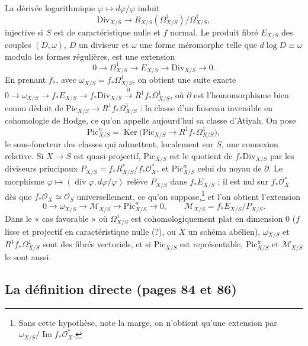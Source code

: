 \documentclass[11pt,a4paper]{article}
\begin{document}
La dérivée logarithmique $\varphi \mapsto d\varphi/\varphi$ induit
\[
\mathrm{Div}_{X/S} \longrightarrow R_{X/S}(\Omega^1_{X/S})/\Omega^1_{X/S} ,
\]
injective si $S$ est de caractéristique nulle et $f$ normal. Le produit fibré
$E_{X/S}$ des couples $(D, \omega)$, $D$ un diviseur et $\omega$ une forme
méromorphe telle que $d\log D \equiv \omega$ modulo les formes régulières, est
une extension
\[
0 \to \Omega^1_{X/S} \to E_{X/S} \to \mathrm{Div}_{X/S} \to 0 .
\]
En prenant $f_*$, avec $\omega_{X/S} = f_*\Omega^1_{X/S}$, on obtient une suite
exacte
$0 \to \omega_{X/S} \to f_*E_{X/S} \to f_*\mathrm{Div}_{X/S} \xrightarrow{\partial} R^1 f_*\Omega^1_{X/S}$,
où $\partial$ est l'homomorphisme bien connu déduit de
$\mathrm{Pic}_{X/S} \to R^1 f_*\Omega^1_{X/S}$ : la classe d'un faisceau
inversible en cohomologie de Hodge, ce qu'on appelle aujourd'hui sa classe
d'Atiyah. On pose
\[
\mathrm{Pic}^w_{X/S} = \operatorname{Ker}\bigl(\mathrm{Pic}_{X/S} \to R^1 f_*\Omega^1_{X/S}\bigr) ,
\]
le sous-foncteur des classes qui admettent, localement sur $S$, une connexion
relative. Si $X \to S$ est quasi-projectif, $\mathrm{Pic}_{X/S}$ est le
quotient de $f_*\mathrm{Div}_{X/S}$ par les diviseurs principaux
$P_{X/S} = f_*R^*_{X/S}/f_*\mathcal{O}^*_X$, et $\mathrm{Pic}^w_{X/S}$ celui
du noyau de $\partial$. Le morphisme $\varphi \mapsto (\operatorname{div}\varphi, d\varphi/\varphi)$
relève $P_{X/S}$ dans $f_*E_{X/S}$ ; il est nul sur $f_*\mathcal{O}^*_X$ dès que
$f_*\mathcal{O}_X \simeq \mathcal{O}_S$ universellement, ce qu'on suppose,\footnote{Sans cette hypothèse, note la marge, on n'obtient
qu'une extension par $\omega_{X/S}/\operatorname{Im} f_*\mathcal{O}^*_X$.} et
l'on obtient l'extension
\[
0 \to \omega_{X/S} \to \mathcal{M}_{X/S} \to \mathrm{Pic}^w_{X/S} \to 0, \qquad
\mathcal{M}_{X/S} = f_*E_{X/S}/P_{X/S} .
\]
Dans le « cas
favorable » où $\Omega^1_{X/S}$ est cohomologiquement plat en dimension $0$
($f$ lisse et projectif en caractéristique nulle (?), ou $X$ un schéma abélien),
$\omega_{X/S}$ et $R^1 f_*\Omega^1_{X/S}$ sont des fibrés vectoriels, et si
$\mathrm{Pic}_{X/S}$ est représentable, $\mathrm{Pic}^w_{X/S}$ et
$\mathcal{M}_{X/S}$ le sont aussi.

\subsection*{La définition directe (pages 84 et 86)}
\end{document}
